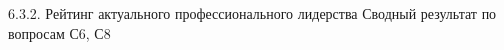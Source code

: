 \begin{frame}{6.3.2. Рейтинг актуального профессионального лидерства}
\tiny 
Сводный результат по вопросам С6, С8

\fontsize{5pt}{5}\selectfont
\begin{center}
\begin{tabular}{cllc}

\end{tabular}
\end{center}
\end{frame}


